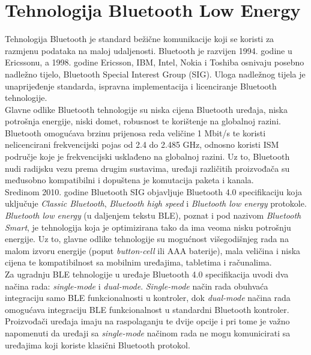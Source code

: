 \chapter{Tehnologija Bluetooth Low Energy}
    
Tehnologija Bluetooth je standard bežične komunikacije koji se koristi za razmjenu podataka na maloj udaljenosti. 
Bluetooth je razvijen 1994. godine u Ericssonu, a 1998. godine Ericsson, IBM, Intel, Nokia i Toshiba osnivaju posebno nadležno tijelo, Bluetooth Special Interest Group (SIG). 
Uloga nadležnog tijela je unaprijeđenje standarda, ispravna implementacija i licenciranje Bluetooth tehnologije.
\\

Glavne odlike Bluetooth tehnologije su niska cijena Bluetooth uređaja, niska potrošnja energije, niski domet, robusnost te korištenje na globalnoj razini. 
Bluetooth omogućava brzinu prijenosa reda veličine 1 Mbit/s te koristi nelicencirani frekvencijski pojas od 2.4 do 2.485 GHz, odnosno koristi ISM područje  koje je frekvencijski usklađeno na globalnoj razini. 
Uz to, Bluetooth nudi radijsku vezu prema drugim sustavima, uređaji različitih proizvođača su međusobno kompatibilni i dopuštena je komutacija paketa i kanala.
\\%

Sredinom 2010. godine Bluetooth SIG objavljuje Bluetooth 4.0 specifikaciju koja uključuje \textit{Classic Bluetooth}, \textit{Bluetooth high speed} i \textit{Bluetooth low energy} protokole. 
\textit{Bluetooth low energy} (u daljenjem tekstu BLE), poznat i pod nazivom \textit{Bluetooth Smart}, je tehnologija koja je optimizirana tako da ima veoma nisku potrošnju energije. 
Uz to, glavne odlike tehnologije su mogućnost višegodišnjeg rada na malom izvoru energije (poput \textit{button-cell} ili AAA baterije), mala veličina i niska cijena te kompatibilnost sa mobilnim uređajima, tabletima i računalima. 
\\
Za ugradnju BLE tehnologije u uređaje Bluetooth 4.0 specifikacija uvodi dva načina rada: \textit{single-mode} i \textit{dual-mode}. 
\textit{Single-mode} način rada obuhvaća integraciju samo BLE funkcionalnosti u kontroler, dok \textit{dual-mode} načina rada omogućava integraciju BLE funkcionalnost u standardni Bluetooth kontroler. 
Proizvođači uređaja imaju na raspolaganju te dvije opcije i pri tome je važno napomenuti da uređaji sa \textit{single-mode} načinom rada ne mogu komunicirati sa uređajima koji koriste klasični Bluetooth protokol.
\\

